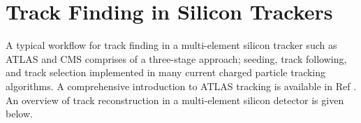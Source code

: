 



\section{Track Finding in Silicon Trackers}
\label{track-finding-silicon-trackers}



A typical workflow for track finding in a multi-element silicon tracker such as ATLAS and CMS comprises of a three-stage approach; seeding, track following, and track selection implemented in many current charged particle tracking algorithms. A comprehensive introduction to ATLAS tracking is available in Ref \cite{Cornelissen:2007vba}. An overview of track reconstruction in a multi-element silicon detector is given below.



